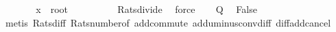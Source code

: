 \begin{isabellebody}
\ \ \isamarkupfalse%
\ \isamarkupfalse%
\ {\isachardoublequoteopen}{}\ {\isacharasterisk}{\kern0pt}\ x\ {\isacharasterisk}{\kern0pt}\ root\ {}\ {}\ {\isasymnotin}\ {\isasymrat}{\isachardoublequoteclose}\isanewline
\ \ \ \ \isamarkupfalse%
\ Rats{\isacharunderscore}{\kern0pt}divide\ \isamarkupfalse%
\ force\isanewline
\ \ \isamarkupfalse%
\ Q\ \isamarkupfalse%
\ False\isanewline
\ \ \ \ \isamarkupfalse%
\ {\isacharparenleft}{\kern0pt}metis\ Rats{\isacharunderscore}{\kern0pt}diff\ Rats{\isacharunderscore}{\kern0pt}number{\isacharunderscore}{\kern0pt}of\ add{\isachardot}{\kern0pt}commute\ add{\isacharunderscore}{\kern0pt}uminus{\isacharunderscore}{\kern0pt}conv{\isacharunderscore}{\kern0pt}diff\ diff{\isacharunderscore}{\kern0pt}add{\isacharunderscore}{\kern0pt}cancel{\isacharparenright}{\kern0pt}\isanewline
{}\isamarkupfalse%
%
\endisatagproof
{\isafoldproof}%
%
\isadelimproof
\isanewline
%
\endisadelimproof
%
\isadelimtheory
\isanewline
%
\endisadelimtheory
%
\isatagtheory
{}\isamarkupfalse%
%
\endisatagtheory
{\isafoldtheory}%
%
\isadelimtheory
%
\endisadelimtheory
%
\end{isabellebody}%
\endinput
